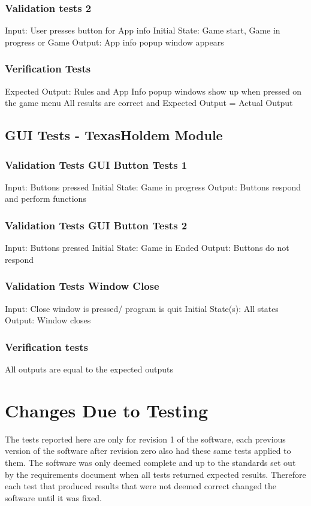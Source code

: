 \documentclass[11pt]{article}
\begin{document}
\subsubsection{Validation tests 2}
Input: User presses button for App info 
Initial State: Game start, Game in progress or Game 
Output: App info popup window appears

\subsubsection{Verification Tests}
Expected Output: Rules and App Info popup windows show up when pressed on the game menu
All results are correct and Expected Output = Actual Output

\subsection{GUI Tests - TexasHoldem Module}

\subsubsection{Validation Tests GUI Button Tests 1}
Input: Buttons pressed
Initial State: Game in progress
Output: Buttons respond and perform functions
 
\subsubsection{Validation Tests GUI Button Tests 2}
Input: Buttons pressed
Initial State: Game in Ended
Output: Buttons do not respond

\subsubsection{Validation Tests Window Close}
Input: Close window is pressed/ program is quit
Initial State(s): All states 
Output: Window closes

\subsubsection{Verification tests}
All outputs are equal to the expected outputs

	\section{Changes Due to Testing}
	The tests reported here are only for revision 1 of the software, each previous version of the software after revision zero also had these same tests applied to them. The software was only deemed complete and up to the standards set out by the requirements document when all tests returned expected results. Therefore each test that produced results that were not deemed correct changed the software until it was fixed.
\end{document}

